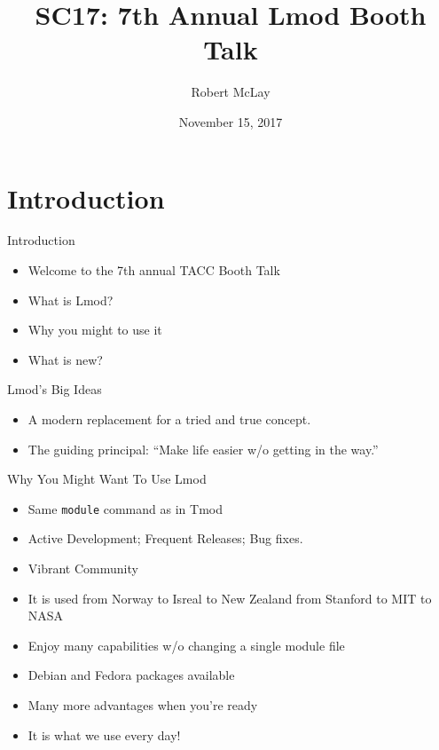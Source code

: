 \documentclass{beamer}
\title{SC17: 7th Annual Lmod Booth Talk}
\author{Robert McLay}
\institute{The Texas Advanced Computing Center}
\date{November 15, 2017}  %
\begin{document}
\begin{frame}
  \titlepage
\end{frame}

\section{Introduction}

\begin{frame}{Introduction}
  \begin{itemize}
    \item Welcome to the 7th annual TACC Booth Talk
    \item What is Lmod?
    \item Why you might to use it
    \item What is new?
  \end{itemize}
\end{frame}

\begin{frame}{Lmod's Big Ideas}
  \begin{itemize}
    \item A modern replacement for a tried and true concept.
    \item The guiding principal: ``Make life easier w/o getting in
      the way.''
  \end{itemize}
\end{frame}

\begin{frame}{Why You Might Want To Use Lmod}
  \begin{itemize}
    \item Same \texttt{module} command as in Tmod
    \item Active Development;  Frequent Releases; Bug fixes.
    \item Vibrant Community
    \item It is used from Norway to Isreal to New Zealand from Stanford to MIT to NASA
    \item Enjoy many capabilities w/o changing a single module file
    \item Debian and Fedora packages available
    \item Many more advantages when you're ready
    \item It is what we use every day!
  \end{itemize}
\end{frame}
\end{document}
